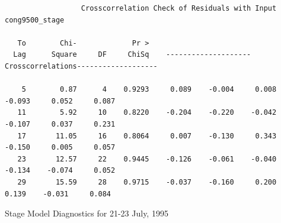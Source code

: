\documentclass[12pt]{report}
\begin{document}
\begin{table}
\scriptsize
\begin{centering}
\begin{verbatim}
                  Crosscorrelation Check of Residuals with Input cong9500_stage

   To        Chi-             Pr >
  Lag      Square     DF     ChiSq    --------------------Crosscorrelations-------------------

    5        0.87      4    0.9293     0.089    -0.004     0.008    -0.093     0.052     0.087
   11        5.92     10    0.8220    -0.204    -0.220    -0.042    -0.107     0.037     0.231
   17       11.05     16    0.8064     0.007    -0.130     0.343    -0.150     0.005     0.057
   23       12.57     22    0.9445    -0.126    -0.061    -0.040    -0.134    -0.074     0.052
   29       15.59     28    0.9715    -0.037    -0.160     0.200     0.139    -0.031     0.084

\end{verbatim}
\end{centering}
\normalsize\caption{Stage Model Diagnostics for 21-23 July, 1995
}\label{tab:JulResDiag}
\end{table}
\end{document}
